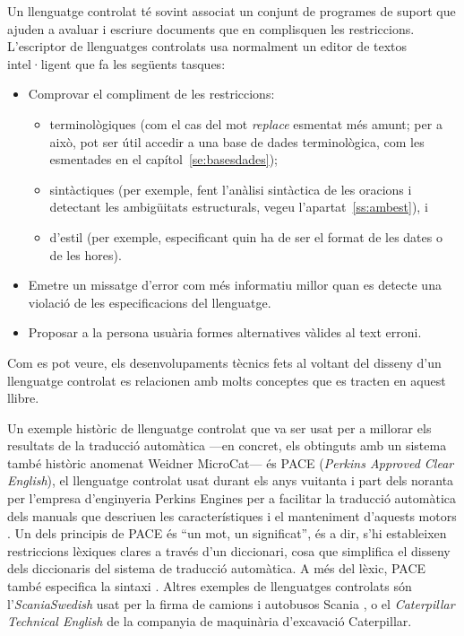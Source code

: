 Un llenguatge controlat té sovint associat un conjunt de programes de
suport que ajuden a avaluar i escriure documents que en complisquen
les restriccions. L'escriptor de llenguatges controlats usa normalment
un editor de textos intel·ligent que fa les següents tasques:
\begin{itemize}
\item Comprovar el compliment de les restriccions:
  \begin{itemize}
  \item terminològiques (com el cas del mot \emph{replace} esmentat
    més amunt; per a això, pot ser útil accedir a una base de dades
    terminològica, com les esmentades en el
    capítol~\ref{se:basesdades});
  \item sintàctiques (per exemple, fent l'anàlisi sintàctica de les
    oracions i detectant les ambigüitats estructurals, vegeu
    l'apartat~\ref{ss:ambest}), i
  \item d'estil (per exemple, especificant quin ha de ser el format de
    les dates o de les hores).
  \end{itemize}
\item Emetre un missatge d'error com més informatiu millor quan es
  detecte una violació de les especificacions del llenguatge.
\item Proposar a la persona usuària formes alternatives vàlides al
  text erroni.
\end{itemize}
Com es pot veure, els desenvolupaments tècnics fets al voltant del
disseny d'un llenguatge controlat es relacionen amb molts conceptes
que es tracten en aquest llibre.

Un exemple històric de llenguatge controlat que va ser usat per a
millorar els resultats de la traducció automàtica ---en concret, els
obtinguts amb un sistema també històric anomenat Weidner MicroCat---
és PACE (\emph{Perkins Approved Clear English}), el llenguatge
controlat usat durant els anys vuitanta i part dels noranta per
l'empresa d'enginyeria Perkins Engines per a facilitar la traducció
automàtica dels manuals que descriuen les característiques i el
manteniment d'aquests motors \citep{newton92b,douglas96p}. Un dels
principis de PACE és ``un mot, un significat'', és a dir, s'hi
estableixen restriccions lèxiques clares a través d'un diccionari,
cosa que simplifica el disseny dels diccionaris del sistema de
traducció automàtica. A més del lèxic, PACE també especifica la
sintaxi \cite[secció~8.3]{arnold94b}. Altres exemples de llenguatges
controlats són l'\emph{ScaniaSwedish} usat per la firma de camions i
autobusos Scania \citep{almqvist96p}, o el {\em Caterpillar Technical
  English} de la companyia de maquinària d'excavació Caterpillar.

